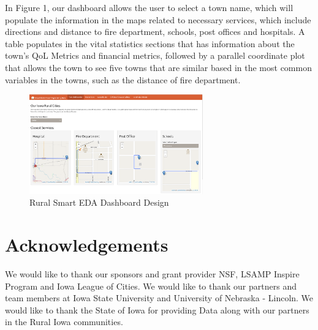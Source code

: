\documentclass[10pt]{article}\usepackage[]{graphicx}\usepackage[]{color}
\begin{document}
In Figure 1, our dashboard allows the user to select a town name, which will populate the information in the maps related to necessary services, which include directions and distance to fire department, schools, post offices and hospitals. A table populates in the vital statistics sections that has information about the town's QoL Metrics and financial metrics, followed by a parallel coordinate plot that allows the town to see five towns that are similar based in the most common variables in the towns, such as the distance of fire department. 

\begin{figure}[ht!]
\centering
\includegraphics[width=75mm]{SCC_Dashboard.png}
\caption{Rural Smart EDA Dashboard Design}
\end{figure}


\section{Acknowledgements}
We would like to thank our sponsors and grant provider NSF, LSAMP Inspire Program and Iowa League of Cities. We would like to thank our partners and team members at Iowa State University and University of Nebraska - Lincoln. We would like to thank the State of Iowa for providing Data along with our partners in the Rural Iowa communities.



\end{document}
